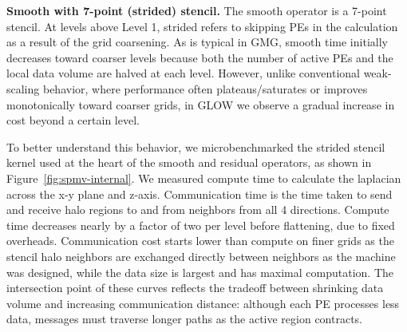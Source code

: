 \documentclass[sigconf]{acmart}
\begin{document}
\textbf{Smooth with 7-point (strided) stencil.}
The smooth operator is a 7-point stencil.  At levels above Level 1, strided refers to skipping PEs in the calculation as a result of the grid coarsening.  
As is typical in GMG, smooth time initially decreases toward coarser levels because both the number of active PEs and the local data volume are halved at each level. However, unlike conventional weak-scaling behavior, %
where performance often plateaus/saturates or improves monotonically toward coarser grids, in GLOW we observe a gradual increase in cost beyond a certain level. 
        
To better understand this behavior, we microbenchmarked the strided stencil kernel used 
at the heart of the smooth and residual operators, as 
shown in Figure~\ref{fig:spmv-internal}. We measured compute time to calculate the laplacian across the x-y plane and z-axis. %
Communication time is the time taken to send and receive halo regions to and from neighbors from all 4 directions. Compute time decreases nearly by a factor of two per level before flattening, due to fixed overheads. Communication cost starts lower than compute on finer grids as the stencil halo neighbors are exchanged directly between neighbors as the machine was designed, while the data size is largest and has maximal computation.
The intersection point of these curves reflects the tradeoff between shrinking data volume and increasing communication distance: although each PE processes less data, messages must traverse longer paths as the active region contracts.
\end{document}
